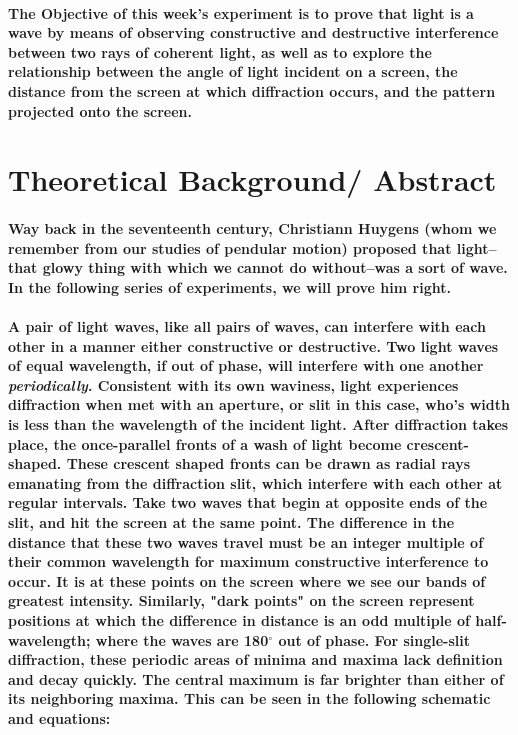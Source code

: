 \documentclass[double]{amsart}
\begin{document}
{
\paragraph{\textbf{The Objective} of this week's experiment is to prove that light is a wave by means of observing constructive and destructive interference between two rays of coherent light, as well as to explore the relationship between the angle of light incident on a screen, the distance from the screen at which diffraction occurs, and the pattern projected onto the screen.}

\section{Theoretical Background/ Abstract}
\paragraph[h]{Way back in the seventeenth century, Christiann Huygens (whom we remember from our studies of pendular motion) proposed that light--that glowy thing with which we cannot do without--was a sort of wave. In the following series of experiments, we will prove him right.}
\paragraph[h!]{A pair of light waves, like all pairs of waves, can interfere with each other in a manner either constructive or destructive. Two light waves of equal wavelength, if out of phase, will interfere with one another \textit{periodically}. Consistent with its own waviness, light experiences diffraction when met with an aperture, or slit in this case, who's width is less than the wavelength of the incident light. After diffraction takes place, the once-parallel fronts of a wash of light become crescent-shaped. These crescent shaped fronts can be drawn as radial rays emanating from the diffraction slit, which interfere with each other at regular intervals. Take two waves that begin at opposite ends of the slit, and hit the screen at the same point. The difference in the distance that these two waves travel must be an integer multiple of their common wavelength for maximum constructive interference to occur. It is at these points on the screen where we see our bands of greatest intensity. Similarly, "dark points" on the screen represent positions at which the difference in distance is an odd multiple of half-wavelength; where the waves are 180$^{\circ}$ out of phase. For single-slit diffraction, these periodic areas of minima and maxima lack definition and decay quickly. The central maximum is far brighter than either of its neighboring maxima. This can be seen in the following schematic and equations: \\ }
}
\end{document}
